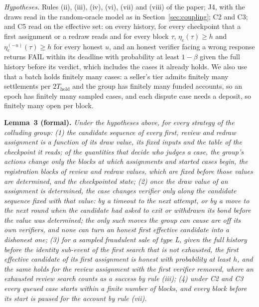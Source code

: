 \documentclass[10pt,a4paper]{article}
\newcommand{\Thold}{T_{\mathrm{hold}}}
\theoremstyle{plain}
\theoremstyle{remark}
\begin{document}
\emph{Hypotheses.} Rules (ii), (iii), (iv), (vi), (vii) and (viii) of the paper; J4, with the draws read in the random-oracle model as in Section~\ref{sec:coupling}; C2 and C3; and C5 read on the effective set: on every history, for every checkpoint that a first assignment or a redraw reads and for every block $\tau$, $\eta_e(\tau)\ge h$ and $\eta_e^{(-u)}(\tau)\ge h$ for every honest $u$, and an honest verifier facing a wrong response returns FAIL within its deadline with probability at least $1-\beta$ given the full history before its verdict, which includes the cases it already holds. We also use that a batch holds finitely many cases: a seller's tier admits finitely many settlements per $2\Thold$ and the group has finitely many funded accounts, so an epoch has finitely many sampled cases, and each dispute case needs a deposit, so finitely many open per block.

\begin{trivlist}\item \textbf{Lemma~3 (formal).} \itshape Under the hypotheses above, for every strategy of the colluding group:
(1) the candidate sequence of every first, review and redraw assignment is a function of its draw value, its fixed inputs and the table of the checkpoint it reads; of the quantities that decide who judges a case, the group's actions change only the blocks at which assignments and started cases begin, the registration blocks of review and redraw values, which are fixed before those values are determined, and the checkpointed state;
(2) once the draw value of an assignment is determined, the case changes verifier only along the candidate sequence fixed with that value: by a timeout to the next attempt, or by a move to the next round when the candidate had asked to exit or withdrawn its bond before the value was determined; the only such moves the group can cause are off its own verifiers, and none can turn an honest first effective candidate into a dishonest one;
(3) for a sampled fraudulent sale of type L, given the full history before the identity sub-event of the first search that is not exhausted, the first effective candidate of its first assignment is honest with probability at least $h$, and the same holds for the review assignment with the first verifier removed, where an exhausted review search counts as a success by rule (iii);
(4) under C2 and C3 every queued case starts within a finite number of blocks, and every block before its start is paused for the account by rule (vii).
\end{trivlist}
\end{document}
